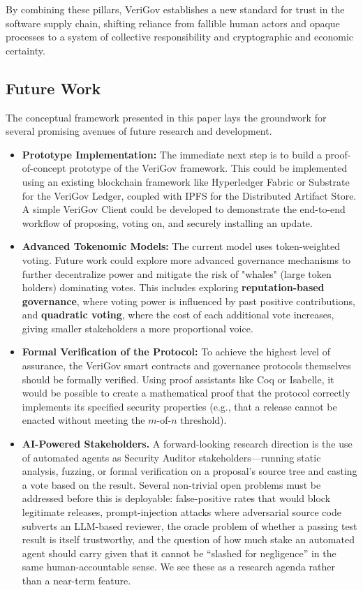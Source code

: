 \documentclass{article}
\begin{document}
By combining these pillars, VeriGov establishes a new standard for trust in the software supply chain, shifting reliance from fallible human actors and opaque processes to a system of collective responsibility and cryptographic and economic certainty.

\subsection{Future Work}

The conceptual framework presented in this paper lays the groundwork for several promising avenues of future research and development.

\begin{itemize}
\item \textbf{Prototype Implementation:} The immediate next step is to build a proof-of-concept prototype of the VeriGov framework. This could be implemented using an existing blockchain framework like Hyperledger Fabric or Substrate for the VeriGov Ledger, coupled with IPFS for the Distributed Artifact Store. A simple VeriGov Client could be developed to demonstrate the end-to-end workflow of proposing, voting on, and securely installing an update.
\item \textbf{Advanced Tokenomic Models:} The current model uses token-weighted voting. Future work could explore more advanced governance mechanisms to further decentralize power and mitigate the risk of "whales" (large token holders) dominating votes. This includes exploring \textbf{reputation-based governance}, where voting power is influenced by past positive contributions, and \textbf{quadratic voting}, where the cost of each additional vote increases, giving smaller stakeholders a more proportional voice.~\cite{lalley2018qv}
\item \textbf{Formal Verification of the Protocol:} To achieve the highest level of assurance, the VeriGov smart contracts and governance protocols themselves should be formally verified. Using proof assistants like Coq or Isabelle, it would be possible to create a mathematical proof that the protocol correctly implements its specified security properties (e.g., that a release cannot be enacted without meeting the $m$-of-$n$ threshold).~\cite{leroy2009compcert}
\item \textbf{AI-Powered Stakeholders.} A forward-looking research direction is the use of automated agents as Security Auditor stakeholders---running static analysis, fuzzing, or formal verification on a proposal's source tree and casting a vote based on the result. Several non-trivial open problems must be addressed before this is deployable: false-positive rates that would block legitimate releases, prompt-injection attacks where adversarial source code subverts an LLM-based reviewer, the oracle problem of whether a passing test result is itself trustworthy, and the question of how much stake an automated agent should carry given that it cannot be ``slashed for negligence'' in the same human-accountable sense. We see these as a research agenda rather than a near-term feature.
\end{itemize}



\end{document}
